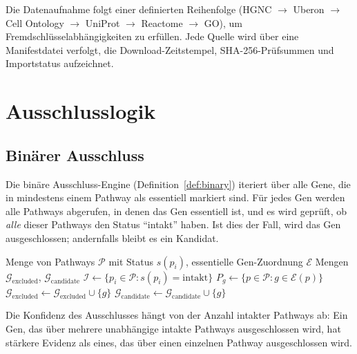 \documentclass[12pt,a4paper]{article}
\begin{document}
Die Datenaufnahme folgt einer definierten Reihenfolge (HGNC $\to$ Uberon $\to$ Cell Ontology $\to$ UniProt $\to$ Reactome $\to$ GO), um Fremdschlüsselabhängigkeiten zu erfüllen. Jede Quelle wird über eine Manifestdatei verfolgt, die Download-Zeitstempel, SHA-256-Prüfsummen und Importstatus aufzeichnet.

\section{Ausschlusslogik}
\label{sec:exclusion}

\subsection{Binärer Ausschluss}

Die binäre Ausschluss-Engine (Definition~\ref{def:binary}) iteriert über alle Gene, die in mindestens einem Pathway als essentiell markiert sind. Für jedes Gen werden alle Pathways abgerufen, in denen das Gen essentiell ist, und es wird geprüft, ob \emph{alle} dieser Pathways den Status "`intakt"' haben. Ist dies der Fall, wird das Gen ausgeschlossen; andernfalls bleibt es ein Kandidat.

\begin{algorithm}[H]
\caption{Binäre Ausschlussanalyse}
\label{alg:binary}
\begin{algorithmic}[1]
\Require Menge von Pathways $\mathcal{P}$ mit Status $s(p_i)$, essentielle Gen-Zuordnung $\mathcal{E}$
\Ensure Mengen $\mathcal{G}_{\text{excluded}}$, $\mathcal{G}_{\text{candidate}}$
\State $\mathcal{I} \gets \{p_i \in \mathcal{P} : s(p_i) = \text{intakt}\}$
 
    \State $P_g \gets \{p \in \mathcal{P} : g \in \mathcal{E}(p)\}$ 
        \State $\mathcal{G}_{\text{excluded}} \gets \mathcal{G}_{\text{excluded}} \cup \{g\}$
    \Else
        \State $\mathcal{G}_{\text{candidate}} \gets \mathcal{G}_{\text{candidate}} \cup \{g\}$
    \EndIf
\EndFor
\end{algorithmic}
\end{algorithm}

Die Konfidenz des Ausschlusses hängt von der Anzahl intakter Pathways ab: Ein Gen, das über mehrere unabhängige intakte Pathways ausgeschlossen wird, hat stärkere Evidenz als eines, das über einen einzelnen Pathway ausgeschlossen wird.
\end{document}
